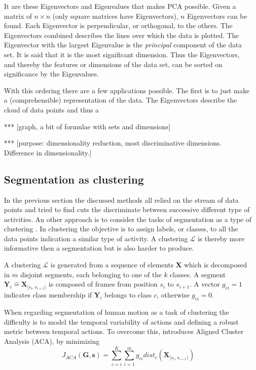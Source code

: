 It are these Eigenvectors and Eigenvalues that makes PCA possible. Given a 
matrix of $n \times n$ (only square matrices have Eigenvectors), $n$ 
Eigenvectors can be found. Each Eigenvector is perpendicular, or orthogonal, 
to the others. The Eigenvectors combined describes the lines over which the 
data is plotted. The Eigenvector with the largest Eigenvalue is the 
\emph{principal} component of the data set. It is said that it is the most 
significant dimension. Thus the Eigenvectors, and thereby the features or 
dimensions of the data set, can be sorted on significance by the Eigenvalues.

With this ordering there are a few applications possible. The first is to just 
make a (comprehensible) representation of the data. The Eigenvectors describe 
the cloud of data points and thus a 

*** [graph, a bit of formulae with sets and dimensions]

***
[purpose: dimensionality reduction, most discriminative dimensions. Difference 
in dimensionality.]

\subsection{Segmentation as clustering}
In the previous section the discussed methods all relied on the stream of data 
points and tried to find cuts the discriminate between successive different 
type of activities. An other approach is to consider the tasks of segmentation 
as a type of clustering \cite{zhou2008aligned}. In clustering the objective is 
to assign labels, or classes, to all the data points indication a similar type 
of activity. A clustering $\mathcal{L}$ is thereby more informative then a 
segmentation but is also harder to produce.

A clustering $\mathcal{L}$ is generated from a sequence of elements 
$\mathbf{X}$ which is decomposed in $m$ disjoint segments, each belonging to 
one of the $k$ classes. A segment $\mathbf{Y}_i \hat{=} 
\mathbf{X}_{[s_i,s_{i+1})}$ is composed of frames from position $s_i$ to 
$s_{i+1}$. A vector $g_{ci} = 1$ indicates class membership if $\mathbf{Y}_i$ 
belongs to class $c$, otherwise $g_{ci} = 0$.

When regarding segmentation of human motion as a task of clustering the 
difficulty is to model the temporal variability of actions 
and defining a robust metric between temporal actions. To overcome this, 
\cite{zhou2008aligned} introduces Aligned Cluster Analysis (ACA), by minimizing
\begin{equation} \label{eq:ACA}
J_{\mathit{ACA}}(\mathbf{G},\mathbf{s}) = 
\sum_{c=i}^{K} \sum_{i=1}^{m} g_{ci} \mathit{dist}_c 
(\mathbf{X}_{[s_i,s_{i+1})})
\end{equation}


